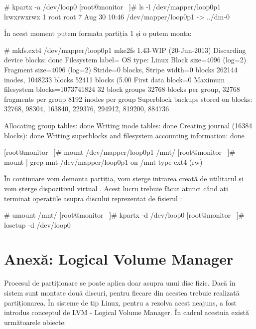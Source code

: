 \begin{screen}
# kpartx -a /dev/loop0
[root@monitor ~]# ls -l /dev/mapper/loop0p1
lrwxrwxrwx 1 root root 7 Aug 30 10:46 /dev/mapper/loop0p1 -> ../dm-0
\end{screen}

În acest moment putem formata partiția 1 și o putem monta:

\begin{screen}
# mkfs.ext4 /dev/mapper/loop0p1
mke2fs 1.43-WIP (20-Jun-2013)
Discarding device blocks: done
Filesystem label=
OS type: Linux
Block size=4096 (log=2)
Fragment size=4096 (log=2)
Stride=0 blocks, Stripe width=0 blocks
262144 inodes, 1048233 blocks
52411 blocks (5.00%
First data block=0
Maximum filesystem blocks=1073741824
32 block groups
32768 blocks per group, 32768 fragments per group
8192 inodes per group
Superblock backups stored on blocks:
        32768, 98304, 163840, 229376, 294912, 819200, 884736


Allocating group tables: done
Writing inode tables: done
Creating journal (16384 blocks): done
Writing superblocks and filesystem accounting information: done


[root@monitor ~]# mount /dev/mapper/loop0p1 /mnt/
[root@monitor ~]# mount | grep mnt
/dev/mapper/loop0p1 on /mnt type ext4 (rw)
\end{screen}

În continuare vom demonta partiția, vom șterge intrarea creată de utilitarul
 și vom șterge dispozitivul virtual . Acest lucru
trebuie făcut atunci când ați terminat operațiile asupra discului reprezentat de
fișierul :

\begin{screen}
# umount /mnt/
[root@monitor ~]# kpartx -d /dev/loop0
[root@monitor ~]# losetup -d /dev/loop0
\end{screen}

\section{Anexă: Logical Volume Manager}
\label{sec:storage-lvm}

Procesul de partiționare se poate aplica doar asupra unui disc fizic. Dacă în
sistem sunt montate două discuri, pentru fiecare din acestea trebuie realizată
partiționarea. În sisteme de tip Linux, pentru a rezolva acest neajuns, a fost
introdus conceptul de LVM - Logical Volume Manager. În cadrul acestuia există
următoarele obiecte:

